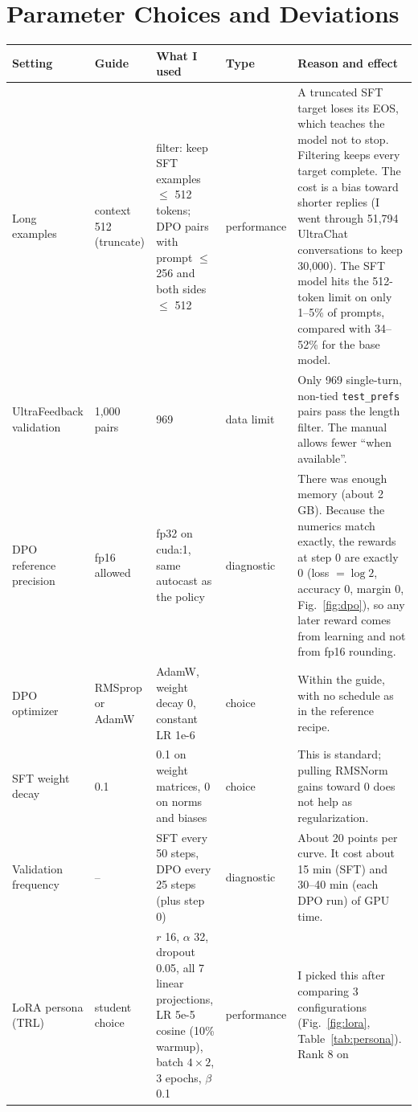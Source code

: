 \documentclass[10pt,a4paper]{article}
\newcommand{\code}[1]{\texttt{\small #1}}
\begin{document}
\section{Parameter Choices and Deviations}

{\footnotesize
\begin{tabularx}{\linewidth}{@{}P{2.1cm}P{1.6cm}P{3.4cm}P{1.35cm}L@{}}
\toprule
Setting & Guide & What I used & Type & Reason and effect \\
\midrule
Long examples & context 512 (truncate) & filter: keep SFT examples $\le$ 512 tokens; DPO pairs with prompt $\le$ 256 and both sides $\le$ 512 & performance &
A truncated SFT target loses its EOS, which teaches the model not to stop. Filtering keeps every target complete. The cost is a bias toward shorter
replies (I went through 51,794 UltraChat conversations to keep 30,000). The SFT model hits the 512-token limit on only 1--5\% of prompts, compared
with 34--52\% for the base model. \\
UltraFeedback validation & 1,000 pairs & 969 & data limit & Only 969 single-turn, non-tied \code{test\_prefs} pairs pass the length filter. The
manual allows fewer ``when available''. \\
DPO reference precision & fp16 allowed & fp32 on cuda:1, same autocast as the policy & diagnostic & There was enough memory (about 2\,GB). Because the
numerics match exactly, the rewards at step 0 are exactly 0 (loss $=\log 2$, accuracy 0, margin 0, Fig.~\ref{fig:dpo}), so any later reward comes from
learning and not from fp16 rounding. \\
DPO optimizer & RMSprop or AdamW & AdamW, weight decay 0, constant LR 1e-6 & choice & Within the guide, with no schedule as in the reference recipe. \\
SFT weight decay & 0.1 & 0.1 on weight matrices, 0 on norms and biases & choice & This is standard; pulling RMSNorm gains toward 0 does not help as
regularization. \\
Validation frequency & -- & SFT every 50 steps, DPO every 25 steps (plus step 0) & diagnostic & About 20 points per curve. It cost about 15 min (SFT)
and 30--40 min (each DPO run) of GPU time. \\
LoRA persona (TRL) & student choice & $r$ 16, $\alpha$ 32, dropout 0.05, all 7 linear projections, LR 5e-5 cosine (10\% warmup), batch $4\times2$,
3 epochs, $\beta$ 0.1 & performance & I picked this after comparing 3 configurations (Fig.~\ref{fig:lora}, Table~\ref{tab:persona}). Rank 8 on

\end{tabularx}}
\end{document}
